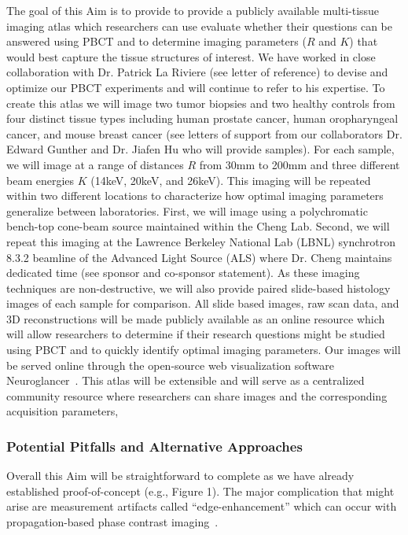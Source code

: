 \documentclass{NIHGrant}
\theoremstyle{theorem}
\begin{document}
The goal of this Aim is to provide to provide a publicly available multi-tissue
imaging atlas which researchers can use evaluate whether their questions
can be answered using PBCT and to determine imaging parameters (\(R\) and \(K\))
that would best capture the tissue structures of interest. We have worked in close collaboration with Dr. Patrick La Riviere (see letter of reference) to devise and optimize our PBCT experiments and will continue to refer to his expertise. To create this atlas
we will image two tumor biopsies and two healthy controls from four distinct
tissue types including human prostate cancer, human oropharyngeal cancer, and mouse
breast cancer (see letters of support from our collaborators Dr. Edward Gunther and Dr. Jiafen Hu who will
provide samples). For each sample, we will image at a range of distances \(R\)
from 30mm to 200mm and three different beam energies \(K\) (14keV, 20keV, and
26keV). This imaging will be repeated within two different locations to
characterize how optimal imaging parameters generalize between laboratories.
First, we will image using a polychromatic bench-top cone-beam source maintained within the
Cheng Lab. Second, we will repeat this imaging at the Lawrence Berkeley National
Lab (LBNL) synchrotron 8.3.2 beamline of the Advanced Light Source (ALS) where Dr.
Cheng maintains dedicated time (see sponsor and co-sponsor statement). As these imaging
techniques are non-destructive, we will also provide paired slide-based
histology images of each sample for comparison. All slide based images, raw scan
data, and 3D reconstructions will be made publicly available as an online
resource which will allow researchers to determine if their research questions
might be studied using PBCT and to quickly identify optimal imaging parameters.
Our images will be served online through the open-source web visualization
software Neuroglancer~\cite{maitin-shepard_googleneuroglancer_2021}. This atlas will be extensible and will serve as a
centralized community resource where researchers can share images and the corresponding acquisition parameters,

\subsubsection*{Potential Pitfalls and Alternative Approaches}
Overall this Aim will be straightforward to complete as we have already
established proof-of-concept (e.g., Figure 1). The major complication that
might arise are measurement artifacts called ``edge-enhancement'' which can
occur with propagation-based phase contrast imaging~\cite{cheng_whole-animal_2011,ding_computational_2019}.
\end{document}
